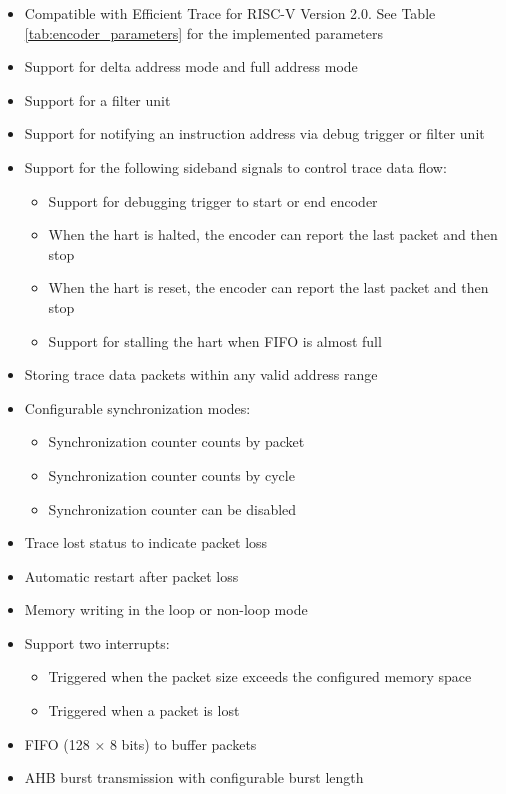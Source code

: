 \documentclass[main\_\_EN.tex]{subfiles}
\begin{document}
\begin{itemize}
    \item Compatible with Efficient Trace for RISC-V Version 2.0. See Table \ref{tab:encoder_parameters} for the implemented parameters
    \item Support for delta address mode and full address mode
    \item Support for a filter unit
    \item Support for notifying an instruction address via debug trigger or filter unit
    \item Support for the following sideband signals to control trace data flow:
        \begin{itemize}
            \item Support for debugging trigger to start or end encoder
            \item When the hart is halted, the encoder can report the last packet and then stop
            \item When the hart is reset, the encoder can report the last packet and then stop
            \item Support for stalling the hart when FIFO is almost full
        \end{itemize}
    \item Storing trace data packets within any valid address range
    \item Configurable synchronization modes:
        \begin{itemize}
            \item Synchronization counter counts by packet
            \item Synchronization counter counts by cycle
            \item Synchronization counter can be disabled
        \end{itemize}
    \item Trace lost status to indicate packet loss
    \item Automatic restart after packet loss
    \item Memory writing in the loop or non-loop mode
    \item Support two interrupts:
        \begin{itemize}
            \item Triggered when the packet size exceeds the configured memory space
            \item Triggered when a packet is lost
        \end{itemize}
    \item FIFO (128 × 8 bits) to buffer packets
    \item AHB burst transmission with configurable burst length
\end{itemize}
\end{document}
